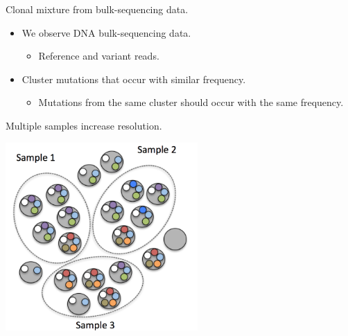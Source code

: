 \documentclass{beamer}
\begin{document}
\begin{frame}{Clonal mixture from bulk-sequencing data.}
\begin{itemize}
	\item We observe DNA bulk-sequencing data.
		\begin{itemize}
			\item Reference and variant reads.
		\end{itemize}
	\pause
	\vspace{0.15in}
	\item Cluster mutations that occur with similar frequency.
	\begin{itemize}
		\item Mutations from the same cluster should occur with the same frequency.
	\end{itemize}
\end{itemize}
\end{frame}

\begin{frame}{Multiple samples increase resolution.}
\centerline{\includegraphics[width=0.55\textwidth]{images/multiplesamples.png}}
\end{frame}

\end{document}
